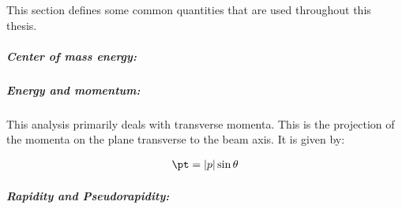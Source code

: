 
This section defines some common quantities that are used throughout this thesis.

\subparagraph{Center of mass energy:}

\subparagraph{Energy and momentum:}
This analysis primarily deals with transverse momenta.
This is the projection of the momenta on the plane transverse to the beam axis.
It is given by:

\begin{align}
\pt = |p| \sin\theta
\end{align}
\subparagraph{Rapidity and Pseudorapidity:}
